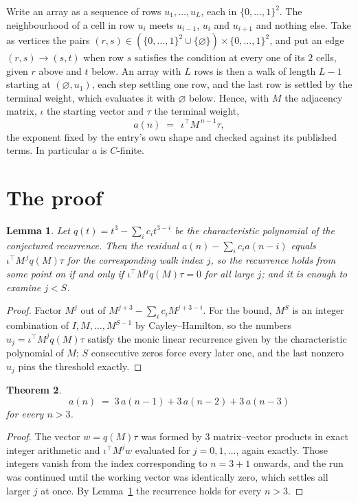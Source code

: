 \documentclass[11pt,a4paper]{article}
\theoremstyle{plain}
\newtheorem{theorem}{Theorem}
\newtheorem{lemma}[theorem]{Lemma}
\theoremstyle{definition}
\begin{document}
Write an array as a sequence of rows $u_1,\dots,u_L$, each in
$\{0,\dots,1\}^{2}$. The neighbourhood of a cell in row $u_i$ meets $u_{i-1}$,
$u_i$ and $u_{i+1}$ and nothing else. Take as vertices the pairs
$(r,s)\in(\{0,\dots,1\}^{2}\cup\{\varnothing\})\times\{0,\dots,1\}^{2}$,
and put an edge $(r,s)\to(s,t)$ when row $s$ satisfies the condition at every one of its
$2$ cells, given $r$ above and $t$ below. An array with $L$ rows is then a walk of length
$L-1$ starting at $(\varnothing,u_1)$, each step settling one row, and the last row is
settled by the terminal weight, which evaluates it with $\varnothing$ below. Hence,
with $M$ the adjacency matrix, $\iota$ the starting vector and $\tau$ the terminal weight,
\[
a(n)\;=\;\,\iota^{\!\top}M^{\,n-1}\tau ,
\]
the exponent fixed by the entry's own shape and checked against its published terms. In
particular $a$ is $C$-finite.

\section{The proof}

\begin{lemma}\label{lem:crit}
Let $q(t)=t^{3}-\sum_i c_it^{3-i}$ be the characteristic polynomial of the
conjectured recurrence. Then the residual $a(n)-\sum_ic_ia(n-i)$ equals
$\iota^{\!\top}M^{\,j}q(M)\tau$ for the corresponding walk index $j$, so the
recurrence holds from some point on if and only if $\iota^{\!\top}M^{j}q(M)\tau=0$ for all
large $j$; and it is enough to examine $j<S$.
\end{lemma}

\begin{proof}
Factor $M^{j}$ out of $M^{j+3}-\sum_ic_iM^{j+3-i}$. For the bound, $M^{S}$
is an integer combination of $I,M,\dots,M^{S-1}$ by Cayley--Hamilton, so the numbers
$u_j=\iota^{\!\top}M^{j}q(M)\tau$ satisfy the monic linear recurrence given by the
characteristic polynomial of $M$; $S$ consecutive zeros force every later one, and the last
nonzero $u_j$ pins the threshold exactly.
\end{proof}

\begin{theorem}
\[
a(n)\;=\;3\,a(n-1) + 3\,a(n-2) + 3\,a(n-3)
\]
for every $n>3$.
\end{theorem}

\begin{proof}
The vector $w=q(M)\tau$ was formed by $3$ matrix--vector products in exact integer
arithmetic and $\iota^{\!\top}M^{j}w$ evaluated for $j=0,1,\dots$, again exactly. Those
integers vanish from the index corresponding to $n=3+1$ onwards, and the run was
continued until the working vector was identically zero, which settles all larger $j$ at once.
By Lemma~\ref{lem:crit} the recurrence holds for every $n>3$.
\end{proof}
\end{document}
